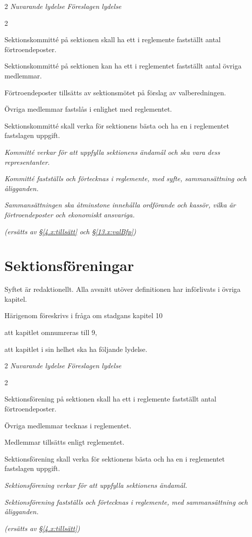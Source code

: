 \documentclass{article}
\newenvironment{lydelse}
    {\begin{paracol}{2}%
        \emph{Nuvarande lydelse}%
        \switchcolumn%
        \emph{Föreslagen lydelse}%
    \end{paracol}%
    \begin{enumerate}[label=\thesubsection.\arabic*]%
    \begin{paracol}{2}%
    }{\end{paracol}\end{enumerate}}
\begin{document}
\begin{lydelse}
\setcounter{section}{9}
\setcounter{subsection}{1}
  \item Sektionskommitté på sektionen skall ha ett i reglemente fastställt antal förtroendeposter.
  \item Sektionskommitté på sektionen kan ha ett i reglementet fastställt antal övriga medlemmar.
  \item Förtroendeposter tillsätts av sektionsmötet på förslag av valberedningen.
  \item Övriga medlemmar fastslås i enlighet med reglementet.
  \item Sektionskommitté skall verka för sektionens bästa och ha en i reglementet fastslagen uppgift.
\switchcolumn
  \setcounter{section}{8}
  \item \emph{Kommitté verkar för att uppfylla sektionens ändamål och ska vara dess representanter.}
  \item \emph{Kommitté fastställs och förtecknas i reglemente, med syfte, sammansättning och åligganden.}
  \item \emph{Sammansättningen ska åtminstone innehålla ordförande och kassör, vilka är förtroendeposter och ekonomiskt ansvariga.}
  \item[] \emph{(ersätts av \S\ref{4.x:tillsätt} och \S\ref{13.x:valBfp})}
\end{lydelse}
\setcounter{section}{8}

\section{Sektionsföreningar}
Syftet är redaktionellt.
Alla avsnitt utöver definitionen har införlivats i övriga kapitel.

Härigenom föreskrivs i fråga om stadgans kapitel 10
\begin{dels}
\item att kapitlet omnumreras till 9,
\item att kapitlet i sin helhet ska ha följande lydelse.
\end{dels}

\begin{lydelse}
\setcounter{section}{10}
\setcounter{subsection}{1}
  \item Sektionsförening på sektionen skall ha ett i reglemente fastställt antal förtroendeposter.
  \item Övriga medlemmar tecknas i reglementet.
  \item Medlemmar tillsätts enligt reglementet.
  \item Sektionsförening skall verka för sektionens bästa och ha en i reglementet fastslagen uppgift.
\switchcolumn
  \setcounter{section}{9}
  \item \emph{Sektionsförening verkar för att uppfylla sektionens ändamål.}
  \item \emph{Sektionsförening fastställs och förtecknas i reglemente, med sammansättning och åligganden.}
  \item[] \emph{(ersätts av \S\ref{4.x:tillsätt})}
\end{lydelse}
\setcounter{section}{9}
\end{document}
